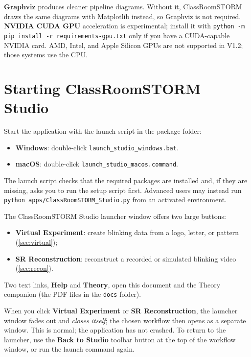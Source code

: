 \documentclass[11pt,a4paper]{article}
\newcommand{\ui}[1]{\textbf{#1}}
\newcommand{\file}[1]{\texttt{#1}}
\newcommand{\app}{ClassRoomSTORM}
\newcommand{\studio}{\app{} Studio}
\begin{document}
\begin{csnote}
\textbf{Graphviz} produces cleaner pipeline diagrams. Without it, \app{} draws
the same diagrams with Matplotlib instead, so Graphviz is not required. \textbf{NVIDIA
CUDA GPU} acceleration is experimental; install it with
\file{python -m pip install -r requirements-gpu.txt} only if you have a
CUDA-capable NVIDIA card. AMD, Intel, and Apple Silicon GPUs are not supported in
V1.2; those systems use the CPU.
\end{csnote}

\section{Starting \studio{}}
\label{sec:launcher}

Start the application with the launch script in the package folder:
\begin{itemize}
\item \textbf{Windows}: double-click \file{launch\_studio\_windows.bat}.
\item \textbf{macOS}: double-click \file{launch\_studio\_macos.command}.
\end{itemize}
The launch
script checks that the required packages are installed and, if they are missing,
asks you to run the setup script first. Advanced users may instead run
\file{python apps/ClassRoomSTORM\_Studio.py} from an activated environment.

The \studio{} launcher window offers two large buttons:
\begin{itemize}
  \item \ui{Virtual Experiment}: create blinking data from a logo, letter, or
        pattern (\cref{sec:virtual});
  \item \ui{SR Reconstruction}: reconstruct a recorded or simulated blinking
        video (\cref{sec:recon}).
\end{itemize}
Two text links, \ui{Help} and \ui{Theory}, open this document and the Theory
companion (the PDF files in the \file{docs} folder).

\begin{cswarn}
When you click \ui{Virtual Experiment} or \ui{SR Reconstruction}, the launcher
window fades out and \emph{closes itself}; the chosen workflow then opens as a
separate window. This is normal; the application has not crashed. To return to
the launcher, use the \ui{Back to Studio} toolbar button at the top of the
workflow window, or run the launch command again.
\end{cswarn}
\end{document}
